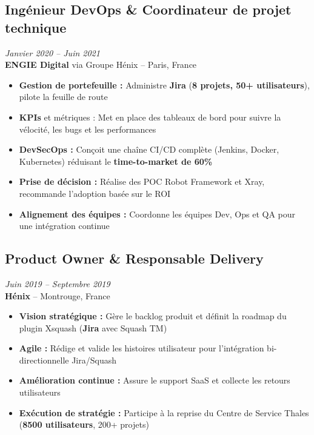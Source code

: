 \documentclass[11pt,a4paper]{article}
\newcommand{\highlight}[1]{\textcolor{primaryblue}{\textbf{#1}}}
\newcommand{\keypoint}[1]{\textbf{#1}}
\begin{document}
\subsection*{Ingénieur DevOps \& Coordinateur de projet technique} \hfill \textit{\color{mediumgray}Janvier 2020 -- Juin 2021}\\
\textcolor{primaryblue}{\textbf{ENGIE Digital}} via Groupe Hénix -- Paris, France
\begin{itemize}[leftmargin=22pt]
    \item \highlight{Gestion de portefeuille :} Administre \highlight{Jira} (\keypoint{8 projets, 50+ utilisateurs}), pilote la feuille de route
    \item \highlight{KPIs} et métriques : Met en place des tableaux de bord pour suivre la vélocité, les bugs et les performances
    \item \highlight{DevSecOps :} Conçoit une chaîne CI/CD complète (Jenkins, Docker, Kubernetes) réduisant le \keypoint{time-to-market de 60\%}
    \item \highlight{Prise de décision :} Réalise des POC Robot Framework et Xray, recommande l'adoption basée sur le ROI
    \item \highlight{Alignement des équipes :} Coordonne les équipes Dev, Ops et QA pour une intégration continue
\end{itemize}

\subsection*{Product Owner \& Responsable Delivery} \hfill \textit{\color{mediumgray}Juin 2019 -- Septembre 2019}\\
\textcolor{primaryblue}{\textbf{Hénix}} -- Montrouge, France
\begin{itemize}[leftmargin=22pt]
    \item \highlight{Vision stratégique :} Gère le backlog produit et définit la roadmap du plugin Xsquash (\highlight{Jira} avec Squash TM)
    \item \highlight{Agile :} Rédige et valide les histoires utilisateur pour l'intégration bi-directionnelle Jira/Squash
    \item \highlight{Amélioration continue :} Assure le support SaaS et collecte les retours utilisateurs
    \item \highlight{Exécution de stratégie :} Participe à la reprise du Centre de Service Thales (\keypoint{8500 utilisateurs}, 200+ projets)
\end{itemize}
\end{document}
